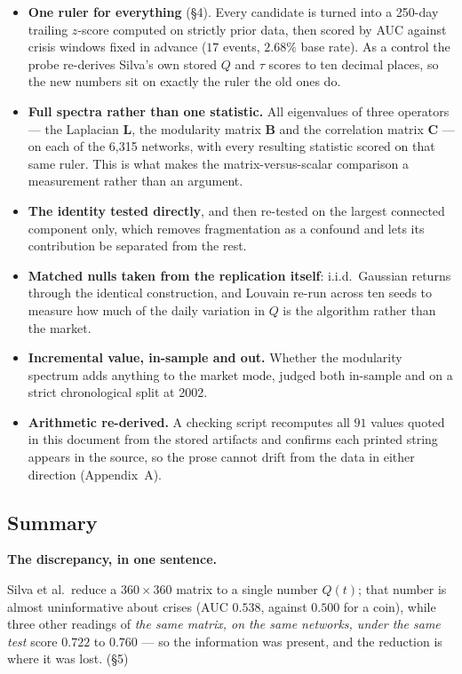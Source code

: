 \documentclass[11pt,a4paper]{article}
\newcommand{\Q}{Q}
\newcommand{\Lap}{\mathbf{L}}
\newcommand{\Bmat}{\mathbf{B}}
\newcommand{\Cmat}{\mathbf{C}}
\newenvironment{aside}[1]
 {\par\vspace{2.5mm}\begin{lrbox}{\asidebox}%
  \begin{minipage}{\dimexpr\textwidth-16pt\relax}\small\textbf{#1}\par\vspace{1mm}}
 {\end{minipage}\end{lrbox}%
  \noindent\setlength{\fboxsep}{7pt}\setlength{\fboxrule}{.4pt}%
  \fcolorbox{Rule}{Panel2}{\usebox{\asidebox}}\par\vspace{2.5mm}}
\begin{document}
\begin{itemize}
\item \textbf{One ruler for everything} (\S4). Every candidate is turned into a
250-day trailing $z$-score computed on strictly prior data, then scored by AUC
against crisis windows fixed in advance ($17$ events, $2.68\%$ base rate). As a
control the probe re-derives Silva's own stored $\Q$ and $\tau$ scores to ten
decimal places, so the new numbers sit on exactly the ruler the old ones do.
\item \textbf{Full spectra rather than one statistic.} All eigenvalues of three
operators --- the Laplacian $\Lap$, the modularity matrix $\Bmat$ and the
correlation matrix $\Cmat$ --- on each of the 6{,}315 networks, with every
resulting statistic scored on that same ruler. This is what makes the
matrix-versus-scalar comparison a measurement rather than an argument.
\item \textbf{The identity tested directly}, and then re-tested on the largest
connected component only, which removes fragmentation as a confound and lets
its contribution be separated from the rest.
\item \textbf{Matched nulls taken from the replication itself}: i.i.d.\
Gaussian returns through the identical construction, and Louvain re-run across
ten seeds to measure how much of the daily variation in $\Q$ is the algorithm
rather than the market.
\item \textbf{Incremental value, in-sample and out.} Whether the modularity
spectrum adds anything to the market mode, judged both in-sample and on a
strict chronological split at 2002.
\item \textbf{Arithmetic re-derived.} A checking script recomputes all $91$
values quoted in this document from the stored artifacts and confirms each
printed string appears in the source, so the prose cannot drift from the data
in either direction (Appendix~A).
\end{itemize}

\subsection*{Summary}

\begin{aside}{The discrepancy, in one sentence.}
Silva et al.\ reduce a $360\times360$ matrix to a single number $\Q(t)$; that
number is almost uninformative about crises (AUC $0.538$, against $0.500$ for a
coin), while three other readings of \emph{the same matrix, on the same
networks, under the same test} score $0.722$ to $0.760$ --- so the information
was present, and the reduction is where it was lost. \hfill(\S5)
\end{aside}
\end{document}
